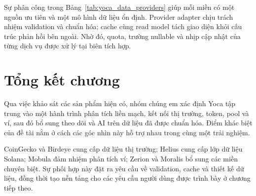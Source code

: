 Sự phân công trong Bảng~\ref{tab:yoca_data_providers} giúp mỗi miền có một nguồn ưu tiên và một mô hình dữ liệu ổn định. Provider adapter chịu trách nhiệm validation và chuẩn hóa; cache cùng read model tách giao diện khỏi cấu trúc phản hồi bên ngoài. Nhờ đó, quota, trường nullable và nhịp cập nhật của từng dịch vụ được xử lý tại biên tích hợp.

\section{Tổng kết chương}
\label{sec:tong_ket_ch2}

Qua việc khảo sát các sản phẩm hiện có, nhóm chúng em xác định Yoca tập trung vào một hành trình phân tích liền mạch, kết nối thị trường, token, pool và ví, sau đó bổ sung theo dõi và AI trên dữ liệu đã được chuẩn hóa. Điểm khác biệt của đề tài nằm ở cách các góc nhìn này hỗ trợ nhau trong cùng một trải nghiệm.

CoinGecko và Birdeye cung cấp dữ liệu thị trường; Helius cung cấp lớp dữ liệu Solana; Mobula đảm nhiệm phân tích ví; Zerion và Moralis bổ sung các miền chuyên biệt. Sự phối hợp này đặt ra yêu cầu về validation, cache và thiết kế dữ liệu, đồng thời tạo nền tảng cho các yêu cầu người dùng được trình bày ở chương tiếp theo.
